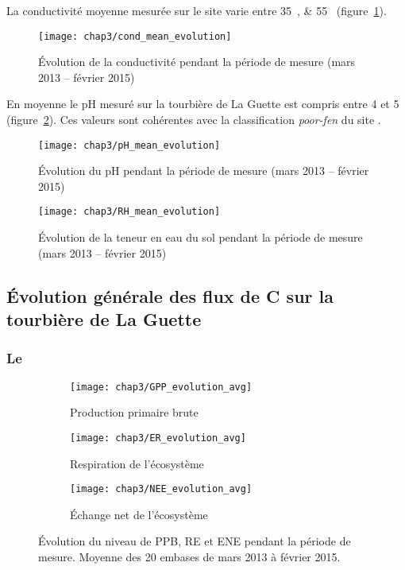 La conductivité moyenne mesurée sur le site varie entre \SIlist{35;55}{\usml} (figure~\ref{fig:cond_mean_evolution}).

\begin{figure}
\centering
\texttt{[image: chap3/cond\_mean\_evolution]}
\caption{Évolution de la conductivité pendant la période de mesure (mars 2013 -- février 2015)}
\label{fig:cond_mean_evolution}
\end{figure}

En moyenne le pH mesuré sur la tourbière de La Guette est compris entre 4 et 5 (figure~\ref{fig:pH_mean_evolution}).
Ces valeurs sont cohérentes avec la classification \textit{poor-fen} du site .

\begin{figure}
\centering
\texttt{[image: chap3/pH\_mean\_evolution]}
\caption{Évolution du pH pendant la période de mesure (mars 2013 -- février 2015)}
\label{fig:pH_mean_evolution}
\end{figure}


\begin{figure}
\centering
\texttt{[image: chap3/RH\_mean\_evolution]}
\caption{Évolution de la teneur en eau du sol pendant la période de mesure (mars 2013 -- février 2015)}
\label{fig:RH_mean_evolution}
\end{figure}

\subsection{Évolution générale des flux de C sur la tourbière de La Guette}

\subsubsection{Le \coo}

\begin{figure}
	\centering
	\begin{subfigure}[t]{\textwidth}
		\centering
		\texttt{[image: chap3/GPP\_evolution\_avg]}
		\caption{Production primaire brute}
		\label{fig:GPP_evolution_avg}
	\end{subfigure}%
	
	\begin{subfigure}[t]{\textwidth}
		\centering
		\texttt{[image: chap3/ER\_evolution\_avg]}
		\caption{Respiration de l'écosystème}
		\label{fig:ER_evolution_avg}
	\end{subfigure}
	
	\begin{subfigure}[t]{\textwidth}
		\centering
		\texttt{[image: chap3/NEE\_evolution\_avg]}
		\caption{Échange net de l'écosystème}
		\label{fig:NEE_evolution_avg}
	\end{subfigure}
\caption{Évolution du niveau de PPB, RE et ENE pendant la période de mesure. Moyenne des 20 embases de mars 2013 à février 2015.}
\label{fig:flux_evolution_avg}
\end{figure}

